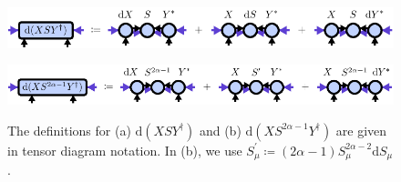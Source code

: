 \begin{figure}
	\centering
	\subcaptionbox{\label{fig:dXSY_definition_trunc}}
	{%
		\includegraphics[scale=1]{figures/tikz/gradient_and_hvp/dXSY_definition/dXSY_definition_a.pdf}
	}
	\par\bigskip
	\subcaptionbox{\label{fig:dXSY_definition_rewnyi}}
	{%
		\includegraphics[scale=1]{figures/tikz/gradient_and_hvp/dXSY_definition/dXSY_definition_b.pdf}
	}
	\caption{The definitions for (a) $\text{d}(XSY^\dagger)$ and (b) $\text{d}(XS^{2\alpha-1}Y^\dagger)$ are given in tensor diagram notation. In (b), we use $S_\mu^\prime \coloneqq (2\alpha-1)S_\mu^{2\alpha-2}\text{d}S_\mu$.}
	\label{fig:dXSY_definition}
\end{figure}